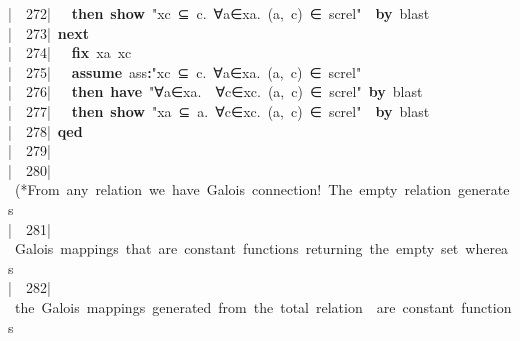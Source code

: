 \documentclass{article}
\newcommand{\syntaxCOMMENTA}[1]{\textcolor[rgb]{0.8,0.0,0.0}{#1}}
\newcommand{\syntaxKEYWORDA}[1]{\textcolor[rgb]{0.0,0.4,0.6}{\textbf{#1}}}
\newcommand{\syntaxKEYWORDC}[1]{\textcolor[rgb]{0.0,0.6,1.0}{\textbf{#1}}}
\newcommand{\syntaxLITERALA}[1]{\textcolor[rgb]{1.0,0.0,0.8}{#1}}
\newcommand{\syntaxOPERATOR}[1]{\textcolor[rgb]{0.0,0.0,0.0}{\textbf{#1}}}
\newcommand{\syntaxCOMMENTA}[1]{\textcolor[rgb]{0.8,0.0,0.0}{#1}}
\newcommand{\syntaxKEYWORDA}[1]{\textcolor[rgb]{0.0,0.4,0.6}{\textbf{#1}}}
\newcommand{\syntaxKEYWORDC}[1]{\textcolor[rgb]{0.0,0.6,1.0}{\textbf{#1}}}
\newcommand{\syntaxLITERALA}[1]{\textcolor[rgb]{1.0,0.0,0.8}{#1}}
\newcommand{\syntaxOPERATOR}[1]{\textcolor[rgb]{0.0,0.0,0.0}{\textbf{#1}}}
\newcommand{\syntaxCOMMENTA}[1]{\textcolor[rgb]{0.8,0.0,0.0}{#1}}
\newcommand{\syntaxKEYWORDA}[1]{\textcolor[rgb]{0.0,0.4,0.6}{\textbf{#1}}}
\newcommand{\syntaxKEYWORDC}[1]{\textcolor[rgb]{0.0,0.6,1.0}{\textbf{#1}}}
\newcommand{\syntaxLITERALA}[1]{\textcolor[rgb]{1.0,0.0,0.8}{#1}}
\newcommand{\syntaxOPERATOR}[1]{\textcolor[rgb]{0.0,0.0,0.0}{\textbf{#1}}}
\newcommand{\syntaxCOMMENTA}[1]{\textcolor[rgb]{0.8,0.0,0.0}{\textbf{#1}}}
\newcommand{\syntaxKEYWORDA}[1]{\textcolor[rgb]{0.0,0.4,0.6}{#1}}
\newcommand{\syntaxKEYWORDC}[1]{\textcolor[rgb]{0.0,0.6,1.0}{#1}}
\newcommand{\syntaxLITERALA}[1]{\textcolor[rgb]{1.0,0.0,0.8}{\textbf{#1}}}
\newcommand{\syntaxOPERATOR}[1]{\textcolor[rgb]{0.0,0.0,0.0}{#1}}
\newcommand{\syntaxCOMMENTA}[1]{\textcolor[rgb]{0.8,0.0,0.0}{#1}}
\newcommand{\syntaxKEYWORDA}[1]{\textcolor[rgb]{0.0,0.4,0.6}{\textbf{#1}}}
\newcommand{\syntaxKEYWORDC}[1]{\textcolor[rgb]{0.0,0.6,1.0}{\textbf{#1}}}
\newcommand{\syntaxLITERALA}[1]{\textcolor[rgb]{1.0,0.0,0.8}{#1}}
\newcommand{\syntaxOPERATOR}[1]{\textcolor[rgb]{0.0,0.0,0.0}{\textbf{#1}}}
\newcommand{\syntaxCOMMENTA}[1]{\textcolor[rgb]{0.8,0.0,0.0}{#1}}
\newcommand{\syntaxKEYWORDA}[1]{\textcolor[rgb]{0.0,0.4,0.6}{\textbf{#1}}}
\newcommand{\syntaxKEYWORDC}[1]{\textcolor[rgb]{0.0,0.6,1.0}{\textbf{#1}}}
\newcommand{\syntaxLITERALA}[1]{\textcolor[rgb]{1.0,0.0,0.8}{#1}}
\newcommand{\syntaxOPERATOR}[1]{\textcolor[rgb]{0.0,0.0,0.0}{\textbf{#1}}}
\newcommand{\syntaxCOMMENTA}[1]{\textcolor[rgb]{0.0,0.0,0.0}{#1}}
\newcommand{\syntaxKEYWORDA}[1]{\textcolor[rgb]{0.0,0.0,0.0}{#1}}
\newcommand{\syntaxKEYWORDC}[1]{\textcolor[rgb]{0.0,0.0,0.0}{#1}}
\newcommand{\gutter}[1]{\textcolor[rgb]{0,0,0}{{|}#1}}
\newcommand{\gutterH}[1]{\textcolor[rgb]{1,0,0}{{|}#1}}
\begin{document}
\gutter{\ \ 272{|}\ }{\ }{\ }\syntaxKEYWORDA{then}{\ }\syntaxKEYWORDC{show}{\ }\syntaxLITERALA{"xc{\ }⊆{\ }\usebox{\opencurlybracket}c.{\ }∀a∈xa.{\ }(a,{\ }c){\ }∈{\ }sc\usebox{\underscorebox}rel\usebox{\closecurlybracket}"}{\ }{\ }\syntaxKEYWORDA{by}{\ }blast{\ }\hspace*{\fill}\\
\gutter{\ \ 273{|}\ }\syntaxKEYWORDA{next}\hspace*{\fill}\\
\gutter{\ \ 274{|}\ }{\ }{\ }\syntaxKEYWORDC{fix}{\ }xa{\ }xc\hspace*{\fill}\\
\gutterH{\ \ 275{|}\ }{\ }{\ }\syntaxKEYWORDC{assume}{\ }ass\syntaxOPERATOR{:}\syntaxLITERALA{"xc{\ }⊆{\ }\usebox{\opencurlybracket}c.{\ }∀a∈xa.{\ }(a,{\ }c){\ }∈{\ }sc\usebox{\underscorebox}rel\usebox{\closecurlybracket}{\ }"}\hspace*{\fill}\\
\gutter{\ \ 276{|}\ }{\ }{\ }\syntaxKEYWORDA{then}{\ }\syntaxKEYWORDA{have}{\ }\syntaxLITERALA{"∀a∈xa.{\ }{\ }∀c∈xc.{\ }(a,{\ }c){\ }∈{\ }sc\usebox{\underscorebox}rel"}{\ }\syntaxKEYWORDA{by}{\ }blast\hspace*{\fill}\\
\gutter{\ \ 277{|}\ }{\ }{\ }\syntaxKEYWORDA{then}{\ }\syntaxKEYWORDC{show}{\ }\syntaxLITERALA{"xa{\ }⊆{\ }\usebox{\opencurlybracket}a.{\ }∀c∈xc.{\ }(a,{\ }c){\ }∈{\ }sc\usebox{\underscorebox}rel\usebox{\closecurlybracket}"}{\ }{\ }\syntaxKEYWORDA{by}{\ }blast{\ }{\ }{\ }{\ }{\ }{\ }\hspace*{\fill}\\
\gutter{\ \ 278{|}\ }\syntaxKEYWORDA{qed}{\ }\hspace*{\fill}\\
\gutter{\ \ 279{|}\ }\hspace*{\fill}\\
\gutterH{\ \ 280{|}\ }\syntaxCOMMENTA{(*From{\ }any{\ }relation{\ }we{\ }have{\ }Galois{\ }connection!{\ }The{\ }empty{\ }relation{\ }generates}\hspace*{\fill}\\
\gutter{\ \ 281{|}\ }\syntaxCOMMENTA{Galois{\ }mappings{\ }that{\ }are{\ }constant{\ }functions{\ }returning{\ }the{\ }empty{\ }set{\ }whereas{\ }}\hspace*{\fill}\\
\gutter{\ \ 282{|}\ }\syntaxCOMMENTA{the{\ }Galois{\ }mappings{\ }generated{\ }from{\ }the{\ }total{\ }relation{\ }{\ }are{\ }constant{\ }functions{\ }}\hspace*{\fill}\\
\end{document}
